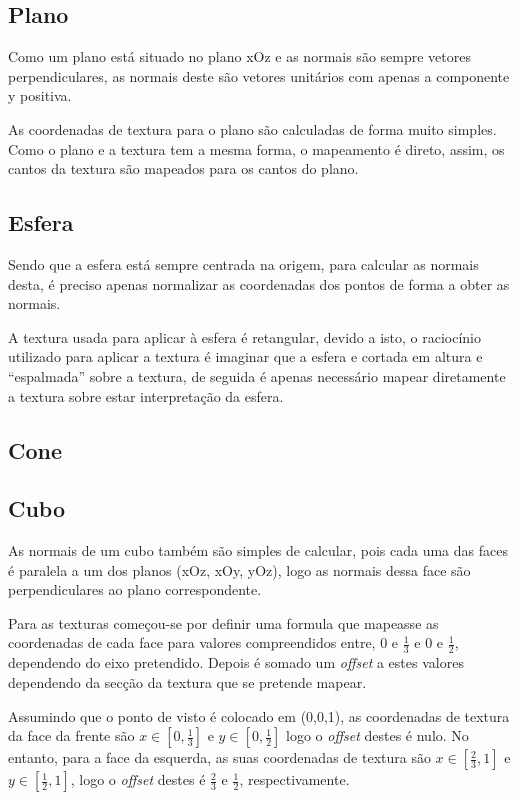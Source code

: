 \documentclass[a4paper]{article}
\begin{document}
\subsection{Plano}
Como um plano está situado no plano xOz e as normais são sempre vetores
perpendiculares, as normais deste são vetores unitários com apenas a componente
y positiva.

As coordenadas de textura para o plano são calculadas de forma
muito simples. Como o plano e a textura tem a mesma forma, o mapeamento é
direto, assim, os cantos da textura são mapeados para os cantos do plano.

\subsection{Esfera}
Sendo que a esfera está sempre centrada na origem, para calcular as normais
desta, é preciso apenas normalizar as coordenadas dos pontos de forma a obter
as normais.

A textura usada para aplicar à esfera é retangular, devido a isto, o raciocínio
utilizado para aplicar a textura é imaginar que a esfera e cortada em altura e
``espalmada'' sobre a textura, de seguida é apenas necessário mapear
diretamente a textura sobre estar interpretação da esfera.

\subsection{Cone}

\subsection{Cubo}
As normais de um cubo também são simples de calcular, pois cada uma das faces é
paralela a um dos planos (xOz, xOy, yOz), logo as normais dessa face são
perpendiculares ao plano correspondente.

Para as texturas começou-se por definir uma formula que mapeasse as coordenadas
de cada face para valores compreendidos entre, 0 e $\frac{1}{3}$ e 0 e
$\frac{1}{2}$, dependendo do eixo pretendido. Depois é somado um
\textit{offset} a estes valores dependendo da secção da textura que se pretende
mapear.

Assumindo que o ponto de visto é colocado em (0,0,1), as coordenadas de textura
da face da frente são $x \in [0,\frac{1}{3}]$ e $y \in [0,\frac{1}{2}]$ logo o
\textit{offset} destes é nulo. No entanto, para a face da esquerda, as suas
coordenadas de textura são $x \in [\frac{2}{3},1]$ e $y \in [\frac{1}{2},1]$,
logo o \textit{offset} destes é $\frac{2}{3}$ e $\frac{1}{2}$, respectivamente.
\end{document}
